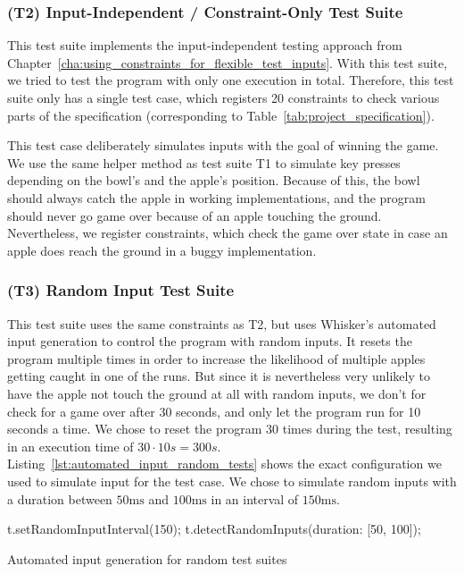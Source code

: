 \subsubsection{(T2) Input-Independent / Constraint-Only Test Suite}

This test suite implements the input-independent testing approach from Chapter~\ref{cha:using_constraints_for_flexible_test_inputs}.
With this test suite, we tried to test the program with only one execution in total.
Therefore, this test suite only has a single test case, which registers 20 constraints to check various parts of the specification
(corresponding to Table~\ref{tab:project_specification}).
\parspace

This test case deliberately simulates inputs with the goal of winning the game.
We use the same helper method as test suite T1 to simulate key presses depending on the bowl's and the apple's position.
Because of this, the bowl should always catch the apple in working implementations,
and the program should never go game over because of an apple touching the ground.
Nevertheless, we register constraints, which check the game over state in case an apple does reach the ground in a buggy implementation.

\subsubsection{(T3) Random Input Test Suite}

This test suite uses the same constraints as T2, but uses Whisker's automated input generation to control the program with random inputs.
It resets the program multiple times in order to increase the likelihood of multiple apples getting caught in one of the runs.
But since it is nevertheless very unlikely to have the apple not touch the ground at all with random inputs,
we don't for check for a game over after 30 seconds, and only let the program run for 10 seconds a time.
We chose to reset the program 30 times during the test, resulting in an execution time of $30 \cdot 10s = 300s$.
Listing~\ref{lst:automated_input_random_tests} shows the exact configuration we used to simulate input for the test case.
We chose to simulate random inputs with a duration between $50\text{ms}$ and $100\text{ms}$ in an interval of $150\text{ms}$.
\parspace

\begin{listing}[htpb]
    \centering
    \begin{minipage}{.55\textwidth}
        \begin{javascriptcode}
            t.setRandomInputInterval(150);
            t.detectRandomInputs({duration: [50, 100]});
        \end{javascriptcode}
    \end{minipage}
    \caption{Automated input generation for random test suites}
    \label{lst:automated_input_random_tests}
\end{listing}

